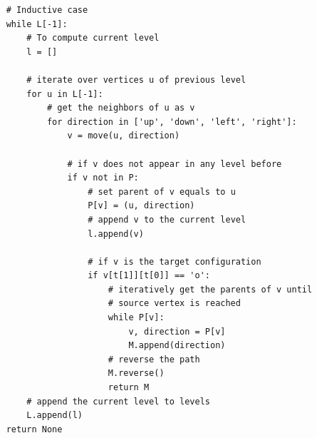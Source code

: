 \documentclass[12pt,twoside]{article}
\begin{document}
\begin{problems}
\begin{problemparts}
\begin{lstlisting}
    # Inductive case
    while L[-1]:
        # To compute current level
        l = []

        # iterate over vertices u of previous level
        for u in L[-1]:
            # get the neighbors of u as v
            for direction in ['up', 'down', 'left', 'right']:
                v = move(u, direction)

                # if v does not appear in any level before
                if v not in P:
                    # set parent of v equals to u
                    P[v] = (u, direction)
                    # append v to the current level
                    l.append(v)

                    # if v is the target configuration
                    if v[t[1]][t[0]] == 'o':
                        # iteratively get the parents of v until 
                        # source vertex is reached
                        while P[v]:
                            v, direction = P[v]
                            M.append(direction)
                        # reverse the path
                        M.reverse()
                        return M
        # append the current level to levels
        L.append(l)
    return None
\end{lstlisting}
\end{problemparts}

\end{problems}
\end{document}
